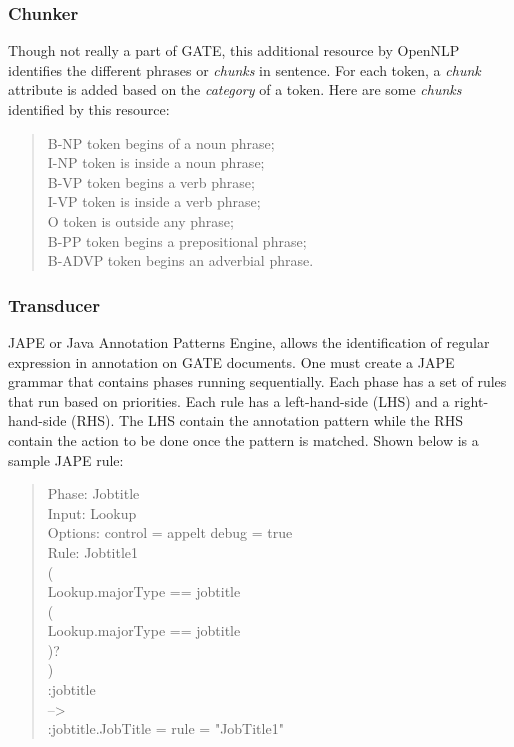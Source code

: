 \subsubsection{Chunker}
\label{sec:chunker}

Though not really a part of GATE, this additional resource by OpenNLP identifies the different phrases or \textit{chunks} in sentence. For each token, a \textit{chunk} attribute is added based on the \textit{category} of a token. Here are some \textit{chunks} identified by this resource:

\begin{verse}
B-NP token begins of a noun phrase;\\
I-NP token is inside a noun phrase;\\
B-VP token begins a verb phrase;\\
I-VP token is inside a verb phrase;\\
O token is outside any phrase;\\
B-PP token begins a prepositional phrase;\\
B-ADVP token begins an adverbial phrase.
\end{verse}

\subsubsection{Transducer}
\label{sec:transducer}

JAPE or Java Annotation Patterns Engine, allows the identification of regular expression in annotation on GATE documents. One must create a JAPE grammar that contains phases running sequentially. Each phase has a set of rules that run based on priorities. Each rule has a left-hand-side (LHS) and a right-hand-side (RHS). The LHS contain the annotation pattern while the RHS contain the action to be done once the pattern is matched. Shown below is a sample JAPE rule:

\begin{verse}
Phase: Jobtitle  \\
Input: Lookup  \\
Options: control = appelt debug = true  \\
Rule: Jobtitle1  \\
(  \\
 {Lookup.majorType == jobtitle}  \\
 (  \\
  {Lookup.majorType == jobtitle}  \\
 )?  \\
)  \\
:jobtitle  \\
-->  \\
 :jobtitle.JobTitle = {rule = "JobTitle1"}\\
\end{verse}

